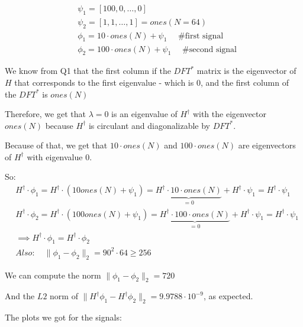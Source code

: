 \documentclass[a4paper]{article}
\begin{document}
\begin{align*}
    & \psi_1 = [100, 0, \dots, 0] \\ 
    & \psi_2 = [1, 1, \dots, 1] = ones(N=64) \\
    & \phi_1 = 10\cdot ones(N) + \psi_1 \quad\text{ \# first signal} \\ 
    & \phi_2 = 100\cdot ones(N) + \psi_1 \quad\text{ \# second signal}
\end{align*}

We know from Q1 that the first column if the $DFT^*$ matrix is the eigenvector of $H$ that corresponds to the first eigenvalue - which is 0, and the first column of the $DFT^*$ is $ones(N)$

Therefore, we get that $\lambda=0$ is an eigenvalue of $H^\dagger$ with the eigenvector $ones(N)$ because $H^\dagger$ is circulant and diagonalizable by $DFT^*$.

Because of that, we get that $10\cdot ones(N)$ and $100\cdot ones(N)$ are eigenvectors of $H^\dagger$ with eigenvalue 0. 

So:
\begin{align*}
    & H^\dagger \cdot \phi_1 = H^\dagger \cdot (10ones(N) + \psi_1) = \underbrace{H^\dagger \cdot 10\cdot ones(N)}_{=0} + H^\dagger \cdot \psi_1 = H^\dagger \cdot \psi_1 \\
    & H^\dagger \cdot \phi_2 = H^\dagger \cdot (100ones(N) + \psi_1) = \underbrace{H^\dagger \cdot 100\cdot ones(N)}_{=0} + H^\dagger \cdot \psi_1 = H^\dagger \cdot \psi_1 \\
    & \implies H^\dagger \cdot \phi_1 = H^\dagger \cdot \phi_2 \\
    & Also: \quad \| \phi_1 - \phi_2 \|_2 = 90^2 \cdot 64 \geq 256
\end{align*}

We can compute the norm $\| \phi_1 - \phi_2 \|_2=720$

And the $L2$ norm of $\| H^\dagger \phi_1 - H^\dagger \phi_2 \|_2 = 9.9788\cdot 10^{-9}$, as expected.

\newpage 

The plots we got for the signals:
\end{document}
